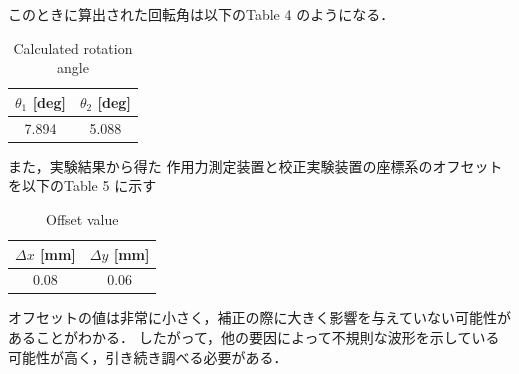 \documentclass[twocolumn,a4j]{jsarticle}
\begin{document}
\newpage

このときに算出された回転角は以下のTable 4 のようになる．

\begin{table}[htbp]
    \begin{center}
        \caption{Calculated rotation angle}
        \begin{tabular}{|p{20mm}|p{20mm}|}
            \hline
            \multicolumn{1}{|c|}{$\theta_1$ [deg]} & \multicolumn{1}{|c|}{$\theta_2$ [deg]} \\ \hline
            \multicolumn{1}{|c|}{7.894}           & \multicolumn{1}{|c|}{5.088}           \\ \hline
        \end{tabular}
    \end{center}
\end{table}

また，実験結果から得た
作用力測定装置と校正実験装置の座標系のオフセットを以下のTable 5 に示す

\begin{table}[htbp]
    \begin{center}
        \caption{Offset value}
        \begin{tabular}{|p{20mm}|p{20mm}|}
            \hline
            \multicolumn{1}{|c|}{$\Delta x$ [mm]} & \multicolumn{1}{|c|}{$\Delta y$ [mm]} \\ \hline
            \multicolumn{1}{|c|}{0.08}           & \multicolumn{1}{|c|}{0.06}           \\ \hline
        \end{tabular}
    \end{center}
\end{table}

オフセットの値は非常に小さく，補正の際に大きく影響を与えていない可能性があることがわかる．
したがって，他の要因によって不規則な波形を示している可能性が高く，引き続き調べる必要がある．
\end{document}
